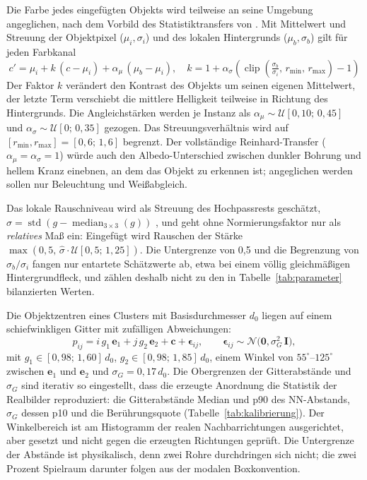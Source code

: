  Die Farbe jedes eingefügten Objekts wird teilweise an
seine Umgebung angeglichen, nach dem Vorbild des Statistiktransfers von
\textcite{reinhard2001}. Mit Mittelwert und Streuung der Objektpixel
($\mu_i, \sigma_i$) und des lokalen Hintergrunds ($\mu_b, \sigma_b$) gilt für
jeden Farbkanal
\begin{equation}
c' = \mu_i + k\,(c - \mu_i) + \alpha_\mu\,(\mu_b - \mu_i),
\quad
k = 1 + \alpha_\sigma\!\left(\operatorname{clip}\!\left(
\tfrac{\sigma_b}{\sigma_i},\, r_{\min},\, r_{\max}\right) - 1\right)
\label{eq:harmonize}
\end{equation}
Der Faktor $k$ verändert den Kontrast des Objekts um seinen eigenen
Mittelwert, der letzte Term verschiebt die mittlere Helligkeit teilweise in
Richtung des Hintergrunds. Die Angleichstärken werden je Instanz als
$\alpha_\mu \sim \mathcal{U}[0{,}10;\,0{,}45]$ und
$\alpha_\sigma \sim \mathcal{U}[0;\,0{,}35]$ gezogen. Das Streuungsverhältnis
wird auf $[r_{\min}, r_{\max}] = [0{,}6;\,1{,}6]$ begrenzt. Der vollständige
Reinhard-Transfer ($\alpha_\mu = \alpha_\sigma = 1$) würde auch den
Albedo-Unterschied zwischen dunkler Bohrung und hellem Kranz einebnen, an dem
das Objekt zu erkennen ist; angeglichen werden sollen nur Beleuchtung und
Weißabgleich.

 Das lokale Rauschniveau wird als Streuung des
Hochpassrests geschätzt, $\hat{\sigma} = \operatorname{std}(g -
\operatorname{median}_{3\times3}(g))$ \parencite[vgl.][]{immerkaer1996}, und
geht ohne Normierungsfaktor nur als \emph{relatives} Maß ein: Eingefügt wird
Rauschen der Stärke $\max(0{,}5,\,\hat{\sigma}\cdot\mathcal{U}[0{,}5;\,1{,}25])$.
Die Untergrenze von 0,5 und die Begrenzung von $\sigma_b/\sigma_i$ fangen
nur entartete Schätzwerte ab, etwa bei einem völlig gleichmäßigen
Hintergrundfleck, und zählen deshalb nicht zu den in
Tabelle~\ref{tab:parameter} bilanzierten Werten.

 Die Objektzentren eines Clusters mit Basisdurchmesser
$d_0$ liegen auf einem schiefwinkligen Gitter mit zufälligen Abweichungen:
\begin{equation}
p_{ij} = i\,g_1\,\mathbf{e}_1 + j\,g_2\,\mathbf{e}_2 + \mathbf{c}
+ \boldsymbol{\epsilon}_{ij},
\qquad \boldsymbol{\epsilon}_{ij} \sim \mathcal{N}\!\big(\mathbf{0},
\sigma_G^2\, \mathbf{I}\big),
\label{eq:layout}
\end{equation}
mit $g_1 \in [0{,}98;\,1{,}60]\,d_0$, $g_2 \in [0{,}98;\,1{,}85]\,d_0$, einem
Winkel von $55^\circ$--$125^\circ$ zwischen $\mathbf{e}_1$ und $\mathbf{e}_2$ und
$\sigma_G = 0{,}17\,d_0$. Die Obergrenzen der Gitterabstände und $\sigma_G$ sind
iterativ so eingestellt, dass die erzeugte Anordnung die Statistik der
Realbilder reproduziert: die
Gitterabstände Median und p90 des NN-Abstands, $\sigma_G$ dessen p10 und die
Berührungsquote (Tabelle~\ref{tab:kalibrierung}). Der Winkelbereich ist am
Histogramm der realen Nachbarrichtungen ausgerichtet, aber gesetzt und nicht
gegen die erzeugten Richtungen geprüft. Die Untergrenze der Abstände ist
physikalisch, denn zwei Rohre durchdringen sich nicht; die zwei Prozent
Spielraum darunter folgen aus der modalen Boxkonvention.

